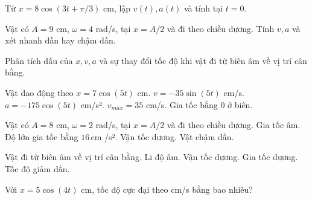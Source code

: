 \begin{ex}
Từ $x=8\cos(3t+\pi/3)$ cm, lập $v(t),a(t)$ và tính tại $t=0$.
\choiceTF

\end{ex}

\begin{ex}
Vật có $A=9$ cm, $\omega=4$ rad/s, tại $x=A/2$ và đi theo chiều dương. Tính $v,a$ và xét nhanh dần hay chậm dần.
\choiceTF

\end{ex}

\begin{ex}
Phân tích dấu của $x,v,a$ và sự thay đổi tốc độ khi vật đi từ biên âm về vị trí cân bằng.
\choiceTF

\end{ex}

\begin{ex}
Vật dao động theo $x=7\cos(5t)$ cm.
\choiceTF
{\True $v=-35\sin(5t)$ cm/s.}
{\True $a=-175\cos(5t)$ cm/s².}
{\True $v_{max}=35$ cm/s.}
{Gia tốc bằng 0 ở biên.}
\end{ex}

\begin{ex}
Vật có $A=8$ cm, $\omega=2$ rad/s, tại $x=A/2$ và đi theo chiều dương.
\choiceTF
{\True Gia tốc âm.}
{\True Độ lớn gia tốc bằng $16\,\text{cm}$ /s².}
{\True Vận tốc dương.}
{\True Vật chậm dần.}
\end{ex}

\begin{ex}
Vật đi từ biên âm về vị trí cân bằng.
\choiceTF
{\True Li độ âm.}
{\True Vận tốc dương.}
{\True Gia tốc dương.}
{Tốc độ giảm dần.}
\end{ex}

\begin{ex}
Với $x=5\cos(4t)$ cm, tốc độ cực đại theo cm/s bằng bao nhiêu?
\end{ex}

